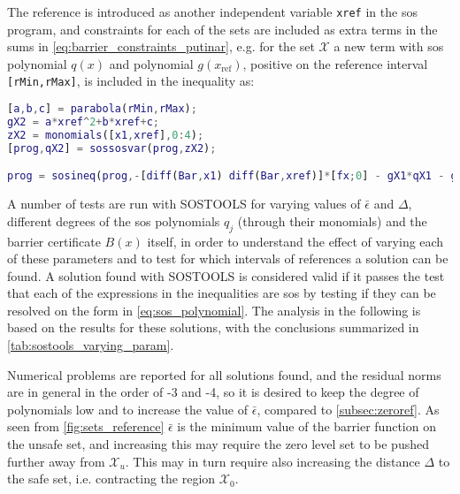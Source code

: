 The reference is introduced as another independent variable \texttt{xref} in the \gls{sos} program, and constraints for each of the sets are included as extra terms in the sums in \autoref{eq:barrier_constraints_putinar}, e.g. for the set $\mathcal{X}$ a new term with \gls{sos} polynomial $q(x)$ and polynomial $g(x_\text{ref})$, positive on the  reference  interval \texttt{[rMin,rMax]}, is included in the inequality as:
\begin{lstlisting}[language=matlab]
% Constraint on the set X0 being nonpositive for the interval of references 
[a,b,c] = parabola(rMin,rMax); 
gX2 = a*xref^2+b*xref+c;
zX2 = monomials([x1,xref],0:4);
[prog,qX2] = sossosvar(prog,zX2);

prog = sosineq(prog,-[diff(Bar,x1) diff(Bar,xref)]*[fx;0] - gX1*qX1 - gX2*qX2);
\end{lstlisting}

A number of tests are run with SOSTOOLS for varying values of $\bar{\epsilon}$ and $\Delta$, different degrees of the \gls{sos} polynomials $q_j$ (through their monomials) and the barrier certificate $B(x)$ itself, in order to understand the effect of varying each of these parameters and to test for which intervals of references a solution can be found.
A solution found with SOSTOOLS is considered valid if it passes the test that each of the expressions in the inequalities are \gls{sos} by testing if they can be resolved on the form in \autoref{eq:sos_polynomial}. The analysis in the following is based on the results for these solutions, with the conclusions summarized in \autoref{tab:sostools_varying_param}.

Numerical problems are reported for all solutions found, and the residual norms are in general in the order of -3 and -4, so it is desired to keep the degree of polynomials low and to increase the value of $\bar{\epsilon}$, compared to \autoref{subsec:zeroref}. As seen from \autoref{fig:sets_reference} $\bar{\epsilon}$ is the minimum value of the barrier function on the unsafe set, and increasing this may require the zero level set to be pushed further away from $\mathcal{X}_u$. This may in turn require also increasing the distance $\Delta$ to the safe set, i.e. contracting the region $\mathcal{X}_0$.

